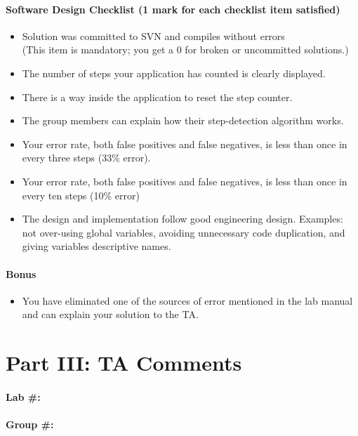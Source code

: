 \documentclass[10pt]{article}
\begin{document}
\paragraph{Software Design Checklist (1 mark for each checklist item satisfied)}
\begin{itemize}
\renewcommand{\labelitemi}{$\Box$}
\item Solution was committed to SVN and compiles without errors \\
(This item is mandatory; you get a 0 for broken or uncommitted solutions.)
\item The number of steps your application has counted is clearly displayed.
\item There is a way inside the application to reset the step counter.
\item The group members can explain how their step-detection algorithm works.
\renewcommand{\labelitemi}{$\Box\Box$}
\item Your error rate, both false positives and false negatives, is less than once in every three steps
(33\% error).
\item Your error rate, both false positives and false negatives, is less than once in every ten steps
(10\% error)
\item The design and implementation follow good engineering design. Examples: not over-using global variables, avoiding unnecessary code duplication, and giving variables descriptive names.
\end{itemize}
\paragraph{Bonus}
\begin{itemize}
\renewcommand{\labelitemi}{$\Box$}
\item You have eliminated one of the sources of error mentioned in the lab manual and can explain
your solution to the TA.
\end{itemize}

\newpage
\section*{Part III: TA Comments}

\paragraph{Lab \#:}
\paragraph{Group \#:}
\end{document}
